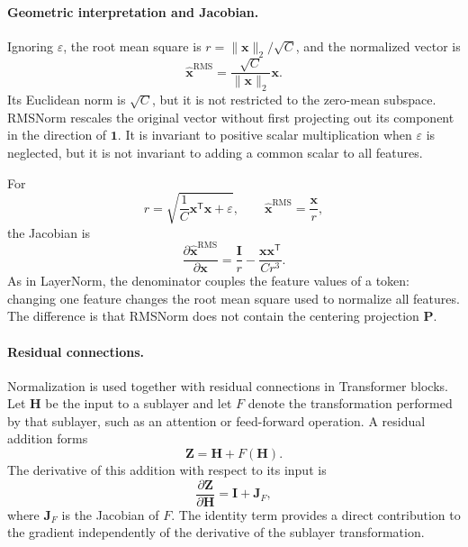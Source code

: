 \paragraph{Geometric interpretation and Jacobian.}
Ignoring \(\varepsilon\), the root mean square is
\(r=\|\mathbf{x}\|_2/\sqrt{C}\), and the normalized vector is
\begin{equation}
    \widehat{\mathbf{x}}^{\mathrm{RMS}}
    =
    \frac{\sqrt{C}}{\|\mathbf{x}\|_2}\mathbf{x}.
    \label{eq:norm-rms-geometric}
\end{equation}
Its Euclidean norm is \(\sqrt{C}\), but it is not restricted to the
zero-mean subspace. RMSNorm rescales the original vector without first
projecting out its component in the direction of \(\mathbf{1}\). It is
invariant to positive scalar multiplication when \(\varepsilon\) is
neglected, but it is not invariant to adding a common scalar to all
features.

For
\begin{equation}
    r
    =
    \sqrt{
        \frac{1}{C}\mathbf{x}^{\mathsf T}\mathbf{x}
        +\varepsilon
    },
    \qquad
    \widehat{\mathbf{x}}^{\mathrm{RMS}}=\frac{\mathbf{x}}{r},
    \label{eq:norm-rms-r-definition}
\end{equation}
the Jacobian is
\begin{equation}
    \boxed{
    \frac{\partial\widehat{\mathbf{x}}^{\mathrm{RMS}}}
    {\partial\mathbf{x}}
    =
    \frac{\mathbf{I}}{r}
    -
    \frac{\mathbf{x}\mathbf{x}^{\mathsf T}}{Cr^{3}}.
    }
    \label{eq:norm-rms-jacobian}
\end{equation}
As in LayerNorm, the denominator couples the feature values of a token:
changing one feature changes the root mean square used to normalize all
features. The difference is that RMSNorm does not contain the centering
projection \(\mathbf{P}\).

\paragraph{Residual connections.}
Normalization is used together with residual connections in Transformer
blocks. Let \(\mathbf{H}\) be the input to a sublayer and let \(F\) denote
the transformation performed by that sublayer, such as an attention or
feed-forward operation. A residual addition forms
\begin{equation}
    \mathbf{Z}
    =
    \mathbf{H}+F(\mathbf{H}).
    \label{eq:norm-residual-addition}
\end{equation}
The derivative of this addition with respect to its input is
\begin{equation}
    \frac{\partial\mathbf{Z}}{\partial\mathbf{H}}
    =
    \mathbf{I}+\mathbf{J}_{F},
    \label{eq:norm-residual-jacobian}
\end{equation}
where \(\mathbf{J}_{F}\) is the Jacobian of \(F\). The identity term
provides a direct contribution to the gradient independently of the
derivative of the sublayer transformation.

